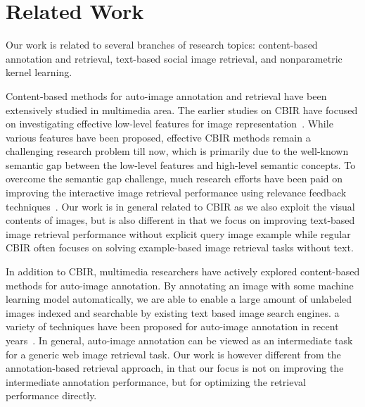 \section{Related Work} \label{sec:rerank-related-work}

Our work is related to several branches of research topics: content-based
annotation and retrieval, text-based social image retrieval, and
nonparametric kernel learning.

Content-based methods for auto-image annotation and retrieval have been
extensively studied in multimedia area. The earlier studies on CBIR have
focused on investigating effective low-level features for image
representation~\cite{pami/SmeuldersWSGJ00}. While various
features have been proposed, effective CBIR methods remain a
challenging research problem till now, which is primarily due to the
well-known semantic gap between the low-level features and high-level
semantic concepts. To overcome the semantic gap challenge, much
research efforts have been paid on improving the interactive image
retrieval performance using relevance feedback techniques~\cite{tcsvt/RuiHOM98}. Our work is in general related to CBIR as we also exploit the visual contents of images, but is also different in that we
focus on improving text-based image retrieval performance without
explicit query image example while regular CBIR often focuses on solving
example-based image retrieval tasks without text.

In addition to CBIR, multimedia researchers have actively explored
content-based methods for auto-image annotation. By annotating an image
with some machine learning model automatically, we are able to enable a
large amount of unlabeled images indexed and searchable by existing text
based image search engines. a variety of techniques have been proposed
for auto-image annotation in recent
years~\cite{mm/DattaGLW06,sigir/WangZZ08,mir/LiuJYXSL08,mm/WuHJZY09}.
In general, auto-image annotation can be viewed as an intermediate task
for a generic web image retrieval task. Our work is however different from
the annotation-based retrieval approach, in that our focus is not on
improving the intermediate annotation performance, but for optimizing the
retrieval performance directly.

